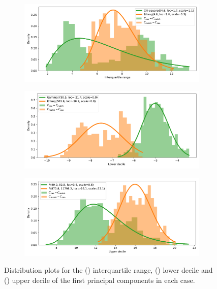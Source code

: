 \begin{figure}
    \centering
    \begin{subfigure}{\imgwidth}
        \includegraphics[width=\linewidth]{interquartile_range.pdf}
        \caption{}\label{fig:edo_iqr}
    \end{subfigure}\vfill%

    \begin{subfigure}{\imgwidth}
        \includegraphics[width=\linewidth]{lower_decile.pdf}
        \caption{}\label{fig:edo_lower}
    \end{subfigure}\vfill%
    
    \begin{subfigure}{\imgwidth}
        \includegraphics[width=\linewidth]{upper_decile.pdf}
        \caption{}\label{fig:edo_upper}
    \end{subfigure}
    \caption{Distribution plots for the () interquartile
        range, () lower decile and
        () upper decile of the first principal components
        in each case.}\label{fig:edo_quantiles}
\end{figure}


